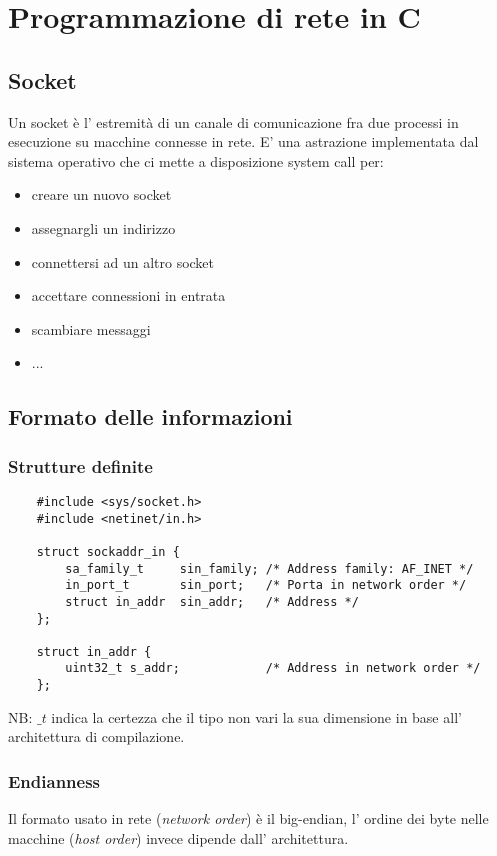 \section{Programmazione di rete in C}

\subsection{Socket}
Un socket è l' estremità di un canale di comunicazione fra due processi in esecuzione su macchine connesse in rete.
E' una astrazione implementata dal sistema operativo che ci mette a disposizione system call per:
\begin{itemize}
    \item creare un nuovo socket
    \item assegnargli un indirizzo
    \item connettersi ad un altro socket
    \item accettare connessioni in entrata
    \item scambiare messaggi
    \item ...
\end{itemize}

\subsection{Formato delle informazioni}
\subsubsection{Strutture definite}
\begin{verbatim}
    #include <sys/socket.h>
    #include <netinet/in.h>
    
    struct sockaddr_in {
        sa_family_t     sin_family; /* Address family: AF_INET */
        in_port_t       sin_port;   /* Porta in network order */
        struct in_addr  sin_addr;   /* Address */
    };
    
    struct in_addr {
        uint32_t s_addr;            /* Address in network order */
    };
\end{verbatim}
NB: $\_t$ indica la certezza che il tipo non vari la sua dimensione in base all' architettura di compilazione.

\subsubsection{Endianness}
Il formato usato in rete (\emph{network order}) è il big-endian, l' ordine dei byte nelle macchine (\emph{host order}) invece dipende dall' architettura.

